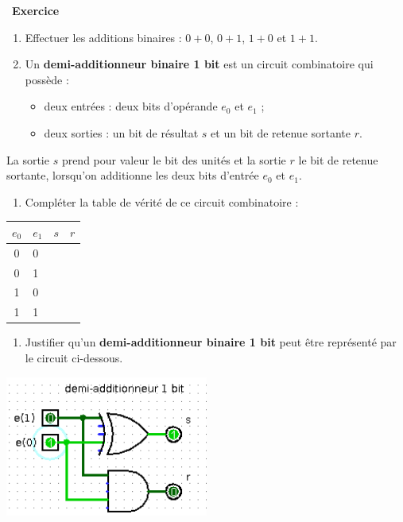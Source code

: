 \documentclass[
  11pt,
]{article}
\providecommand{\tightlist}{%
  \setlength{\itemsep}{0pt}\setlength{\parskip}{0pt}}
\newcounter{exo}
\newenvironment{exercice}[1]
{\par \medskip   \addtocounter{exo}{1} \noindent  
\begin{bclogo}[arrondi =0.1,   noborder = true, logo=\bccrayon, marge=4]{~\textbf{Exercice} \textbf{\theexo} {\itshape #1} }  \par}
{
\end{bclogo}
 \par \bigskip }
\newcounter{def}
\begin{document}
\begin{exercice}{}

\begin{enumerate}
\def\labelenumi{\arabic{enumi}.}
\item
  Effectuer les additions binaires : \(0+0\), \(0+1\), \(1+0\) et
  \(1+1\).
\item
  Un \textbf{demi-additionneur binaire 1 bit} est un circuit
  combinatoire qui possède :

  \begin{itemize}
  \tightlist
  \item
    deux entrées : deux bits d'opérande \(e_{0}\) et \(e_{1}\) ;
  \item
    deux sorties : un bit de résultat \(s\) et un bit de retenue
    sortante \(r\).
  \end{itemize}
\end{enumerate}

La sortie \(s\) prend pour valeur le bit des unités et la sortie \(r\)
le bit de retenue sortante, lorsqu'on additionne les deux bits d'entrée
\(e_{0}\) et \(e_{1}\).

\begin{enumerate}
\def\labelenumi{\arabic{enumi}.}
\tightlist
\item
  Compléter la table de vérité de ce circuit combinatoire :
\end{enumerate}

\begin{longtable}[]{@{}clll@{}}
\toprule
\(e_{0}\) & \(e_{1}\) & \(s\) & \(r\)\tabularnewline
\midrule
\endhead
0 & 0 & &\tabularnewline
0 & 1 & &\tabularnewline
1 & 0 & &\tabularnewline
1 & 1 & &\tabularnewline
\bottomrule
\end{longtable}

\begin{enumerate}
\def\labelenumi{\arabic{enumi}.}
\setcounter{enumi}{3}
\tightlist
\item
  Justifier qu'un \textbf{demi-additionneur binaire 1 bit} peut être
  représenté par le circuit ci-dessous.
\end{enumerate}

\includegraphics[width=0.5\textwidth,height=\textheight]{images/demi_additionneur.png}\\


\end{exercice}
\end{document}
